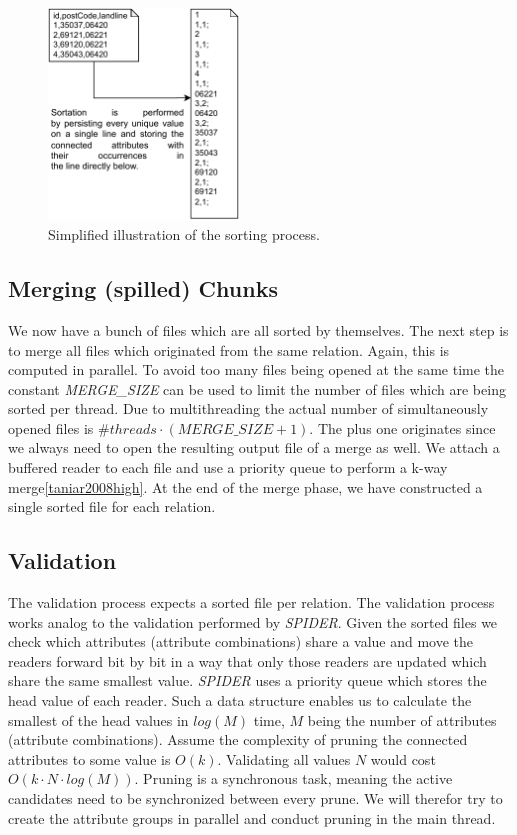 \begin{figure}[h]
    \centering
    \includegraphics[width=0.45\textwidth]{files/Sorting.pdf}
    \caption{Simplified illustration of the sorting process.}
    \label{fig:sorting}
\end{figure}

\subsection{Merging (spilled) Chunks}
We now have a bunch of files which are all sorted by themselves. The next step is to merge all files which originated from the same relation. Again, this is computed in parallel. To avoid too many files being opened at the same time the constant \textit{MERGE\_SIZE} can be used to limit the number of files which are being sorted per thread. Due to multithreading the actual number of simultaneously opened files is $\#threads \cdot (MERGE\_SIZE + 1)$. The plus one originates since we always need to open the resulting output file of a merge as well. We attach a buffered reader to each file and use a priority queue to perform a k-way merge\ref{taniar2008high}. At the end of the merge phase, we have constructed a single sorted file for each relation.

\subsection{Validation}\label{sec:spind_val}
The validation process expects a sorted file per relation. The validation process works analog to the validation performed by \textit{SPIDER}. Given the sorted files we check which attributes (attribute combinations) share a value and move the readers forward bit by bit in a way that only those readers are updated which share the same smallest value. \textit{SPIDER} uses a priority queue which stores the head value of each reader. Such a data structure enables us to calculate the smallest of the head values in $log(M)$ time, $M$ being the number of attributes (attribute combinations). Assume the complexity of pruning the connected attributes to some value is $O(k)$. Validating all values $N$ would cost $O(k \cdot N \cdot log(M))$. Pruning is a synchronous task, meaning the active candidates need to be synchronized between every prune. We will therefor try to create the attribute groups in parallel and conduct pruning in the main thread.

